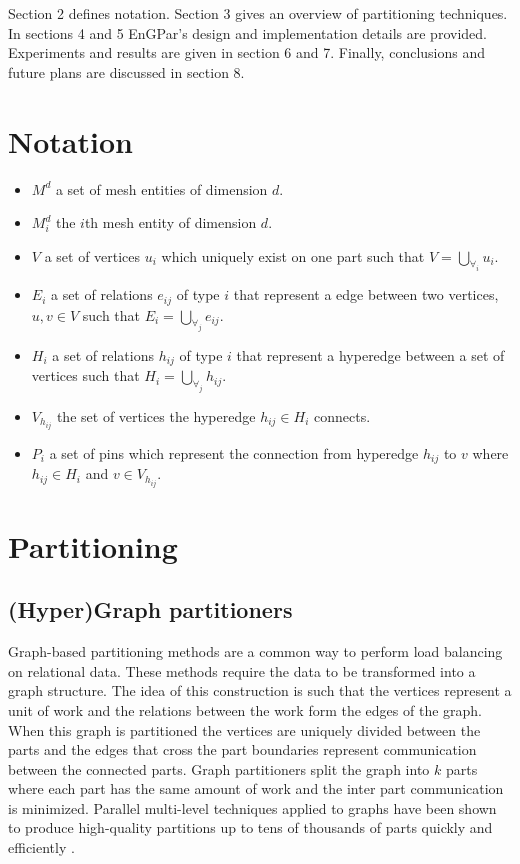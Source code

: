 Section 2 defines notation. Section 3 gives an overview of
partitioning techniques. In sections 4
and 5 EnGPar's design and implementation details
are provided. Experiments and results are
given in section 6 and 7. Finally, conclusions
and future plans are discussed in section 8.

\section{Notation}
\begin{itemize}
  \item $M^d$ a set of mesh entities of dimension $d$.
  \item $M_i^d$ the $i$th mesh entity of dimension $d$.
  \item $V$ a set of vertices $u_i$ which uniquely
    exist on one part such that $V = \bigcup_{\forall_i}u_i$.
  \item $E_i$ a set of relations $e_{ij}$ of type $i$ that represent a
    edge between two vertices, $u,v\in V$ such that $E_i = \bigcup_{\forall_j}e_{ij}$.
  \item $H_i$ a set of relations $h_{ij}$ of type $i$ that represent a
    hyperedge between a set of vertices such that $H_i = \bigcup_{\forall_j}h_{ij}$.
  \item $V_{h_{ij}}$ the set of vertices the hyperedge $h_{ij}\in H_i$ connects.
  \item $P_i$ a set of pins which represent the connection from hyperedge
        $h_{ij}$ to $v$ where $h_{ij} \in H_i$ and $v \in V_{h_{ij}}$.
\end{itemize}

\section{Partitioning}

\subsection{(Hyper)Graph partitioners}
Graph-based partitioning methods are a common way to perform
load balancing on relational data. These methods require
the data to be transformed into a graph structure. The idea of this
construction is such that the vertices represent a unit of work
and the relations between the work form the edges of the graph.
When this graph is partitioned the vertices are uniquely divided
between the parts and the edges that cross the part boundaries
represent communication between the connected parts. Graph
partitioners split the graph into $k$ parts 
where each part has the same amount of work and the inter part
communication is minimized. Parallel multi-level techniques
applied to graphs have been shown to produce high-quality
partitions up to tens of thousands of parts quickly and efficiently
\cite{catalyurek2013umpa,karypis1999parallel,lasalle2013multi,schloegel2002parallel}.

